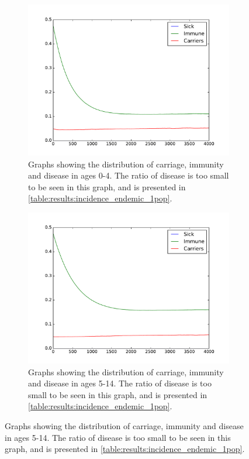 \documentclass[10pt,a4paper]{article}
\begin{document}
\begin{figure}
	\centering
	\begin{subfigure}{0.3\textwidth}
		\includegraphics[width=\textwidth]{figures/endemic_1pop_A_infants}
		\caption{Graphs showing the distribution of carriage, immunity and disease in ages 0-4. The ratio of disease is too small to be seen in this graph, and is presented in \cref{table:results:incidence_endemic_1pop}.} \label{fig:results:agedist_A_infants}
	\end{subfigure}
	\begin{subfigure}{0.3\textwidth}
		\includegraphics[width=\textwidth]{figures/endemic_1pop_A_young}
		\caption{Graphs showing the distribution of carriage, immunity and disease in ages 5-14. The ratio of disease is too small to be seen in this graph, and is presented in \cref{table:results:incidence_endemic_1pop}.} \label{fig:results:agedist_A_young}

\end{subfigure}
\end{figure}
\end{document}
